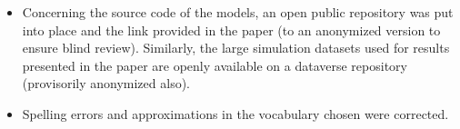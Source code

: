 \documentclass[11pt,a4paper,sans]{moderncv}        %
\begin{document}
\begin{itemize}
	\item Concerning the source code of the models, an open public repository was put into place and the link provided in the paper (to an anonymized version to ensure blind review). Similarly, the large simulation datasets used for results presented in the paper are openly available on a dataverse repository (provisorily anonymized also).
	
	\item Spelling errors and approximations in the vocabulary chosen were corrected.
\end{itemize}







\justify




\makeletterclosing
\end{document}
